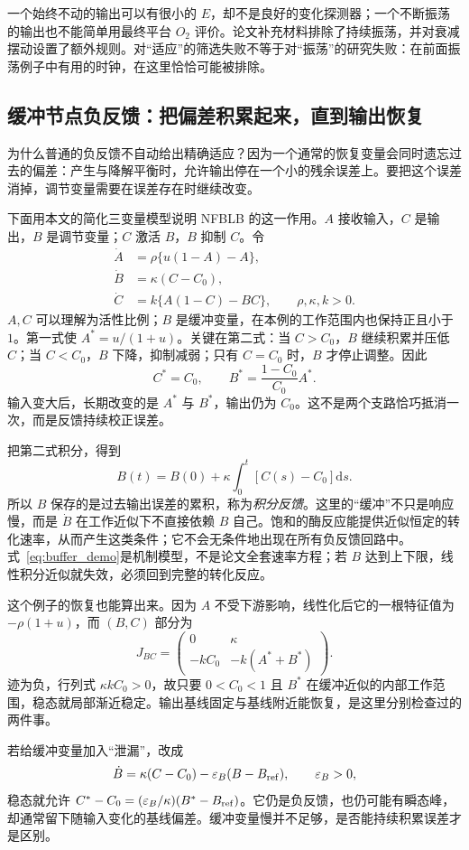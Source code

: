 \documentclass[11pt,a4paper,UTF8,fontset=fandol]{ctexart}
\newcommand{\dd}{\mathrm d}\newcommand{\R}{\mathbb R}\newcommand{\ssv}{\mathrm{ss}}
\begin{document}
一个始终不动的输出可以有很小的 $E$，却不是良好的变化探测器；一个不断振荡的输出也不能简单用最终平台 $O_2$ 评价。论文补充材料排除了持续振荡，并对衰减摆动设置了额外规则。对“适应”的筛选失败不等于对“振荡”的研究失败：在前面振荡例子中有用的时钟，在这里恰恰可能被排除。

\subsection{缓冲节点负反馈：把偏差积累起来，直到输出恢复}
为什么普通的负反馈不自动给出精确适应？因为一个通常的恢复变量会同时遗忘过去的偏差：产生与降解平衡时，允许输出停在一个小的残余误差上。要把这个误差消掉，调节变量需要在误差存在时继续改变。

下面用本文的简化三变量模型说明 NFBLB 的这一作用。$A$ 接收输入，$C$ 是输出，$B$ 是调节变量；$C$ 激活 $B$，$B$ 抑制 $C$。令
\begin{align}
\dot A&=\rho\{u(1-A)-A\},\\
\dot B&=\kappa(C-C_0),\\
\dot C&=k\{A(1-C)-BC\},\qquad \rho,\kappa,k>0.\label{eq:buffer_demo}
\end{align}
$A,C$ 可以理解为活性比例；$B$ 是缓冲变量，在本例的工作范围内也保持正且小于 $1$。第一式使 $A^*=u/(1+u)$。关键在第二式：当 $C>C_0$，$B$ 继续积累并压低 $C$；当 $C<C_0$，$B$ 下降，抑制减弱；只有 $C=C_0$ 时，$B$ 才停止调整。因此
\[
C^*=C_0,\qquad B^*=\frac{1-C_0}{C_0}A^*.
\]
输入变大后，长期改变的是 $A^*$ 与 $B^*$，输出仍为 $C_0$。这不是两个支路恰巧抵消一次，而是反馈持续校正误差。

把第二式积分，得到
\[
B(t)=B(0)+\kappa\int_0^t[C(s)-C_0]\dd s.
\]
所以 $B$ 保存的是过去输出误差的累积，称为\emph{积分反馈}。这里的“缓冲”不只是响应慢，而是 $\dot B$ 在工作近似下不直接依赖 $B$ 自己。饱和的酶反应能提供近似恒定的转化速率，从而产生这类条件；它不会无条件地出现在所有负反馈回路中。式~\eqref{eq:buffer_demo}是机制模型，不是论文全套速率方程；若 $B$ 达到上下限，线性积分近似就失效，必须回到完整的转化反应。

这个例子的恢复也能算出来。因为 $A$ 不受下游影响，线性化后它的一根特征值为 $-\rho(1+u)$，而 $(B,C)$ 部分为
\[
J_{BC}=\begin{pmatrix}0&\kappa\\-kC_0&-k(A^*+B^*)\end{pmatrix}.
\]
迹为负，行列式 $\kappa kC_0>0$，故只要 $0<C_0<1$ 且 $B^*$ 在缓冲近似的内部工作范围，稳态就局部渐近稳定。输出基线固定与基线附近能恢复，是这里分别检查过的两件事。

若给缓冲变量加入“泄漏”，改成
\[
\dot B=\kappa(C-C_0)-\varepsilon_B(B-B_{\rm ref}),\qquad\varepsilon_B>0,
\]
稳态就允许 $C^*-C_0=(\varepsilon_B/\kappa)(B^*-B_{\rm ref})$。它仍是负反馈，也仍可能有瞬态峰，却通常留下随输入变化的基线偏差。缓冲变量慢并不足够，是否能持续积累误差才是区别。
\end{document}
